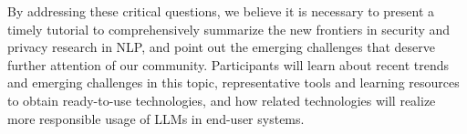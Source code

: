 \begin{tutorial}
By addressing these critical questions, we believe it is necessary to present a timely tutorial to comprehensively summarize the new frontiers in security and privacy research in NLP, and point out the emerging challenges that deserve further attention of our community. Participants will learn about recent trends and emerging challenges in this topic, representative tools and learning resources to obtain ready-to-use technologies, and how related technologies will realize more responsible usage of LLMs in end-user systems.

\end{tutorial}
